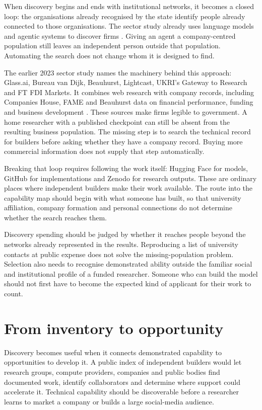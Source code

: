 \documentclass[11pt,a4paper]{article}
\begin{document}
When discovery begins and ends with institutional networks, it becomes a
closed loop: the organisations already recognised by the state identify
people already connected to those organisations. The sector study already
uses language models and agentic systems to discover firms
\cite{sectorstudy}. Giving an agent a company-centred population still leaves
an independent person outside that population. Automating the search does
not change whom it is designed to find.

The earlier 2023 sector study names the machinery behind this approach:
Glass.ai, Bureau van Dijk, Beauhurst, Lightcast, UKRI's Gateway to Research
and FT FDI Markets. It combines web research with company records, including
Companies House, FAME and Beauhurst data on financial performance, funding
and business development \cite{sectorstudy2023}. These sources make firms
legible to government. A home researcher with a published checkpoint can
still be absent from the resulting business population. The missing step
is to search the technical record for builders before asking whether they
have a company record. Buying more commercial information does not supply
that step automatically.

Breaking that loop requires following the work itself: Hugging Face for
models, GitHub for implementations and Zenodo for research outputs. These
are ordinary places where independent builders make their work available.
The route into the capability map should begin with what someone has built,
so that university affiliation, company formation and personal connections
do not determine whether the search reaches them.

Discovery spending should be judged by whether it reaches people beyond
the networks already represented in the results. Reproducing a list of
university contacts at public expense does not solve the missing-population
problem. Selection also needs to recognise demonstrated ability outside
the familiar social and institutional profile of a funded researcher.
Someone who can build the model should not first have to become the
expected kind of applicant for their work to count.



\section{From inventory to opportunity}
Discovery becomes useful when it connects demonstrated capability to
opportunities to develop it. A public index of
independent builders would let research groups, compute providers, companies
and public bodies find documented work, identify collaborators and determine
where support could accelerate it. Technical capability should be
discoverable before a researcher learns to market a company or builds a
large social-media audience.
\end{document}
